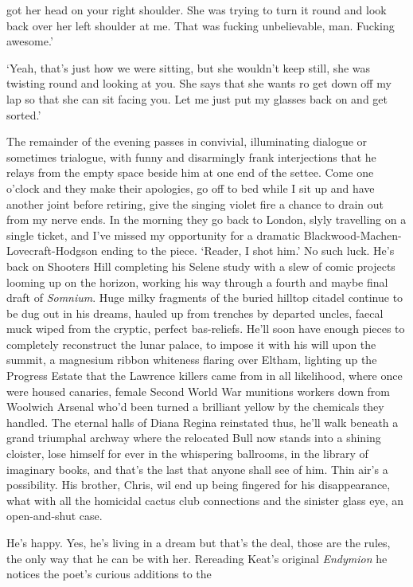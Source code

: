 \documentclass[
]{article}
\begin{document}
got her head on your right shoulder. She was trying to turn it round and
look back over her left shoulder at me. That was fucking unbelievable,
man. Fucking awesome.' \par
`Yeah, that's just how we were sitting, but she wouldn't keep
still, she was twisting round and looking at you. She says that she
wants ro get down off my lap so that she can sit facing you. Let me just
put my glasses back on and get sorted.' \par
The remainder of the evening passes in convivial, illuminating
dialogue or sometimes trialogue, with funny and disarmingly frank
interjections that he relays from the empty space beside him at one end
of the settee. Come one o'clock and they make their apologies, go off to
bed while I sit up and have another joint before retiring, give the
singing violet fire a chance to drain out from my nerve ends. In the
morning they go back to London, slyly travelling on a single ticket, and
I've missed my opportunity for a dramatic
Blackwood-Machen-Lovecraft-Hodgson ending to the piece. `Reader, I shot
him.' No such luck. He's back on Shooters Hill completing his Selene
study with a slew of comic projects looming up on the horizon, working
his way through a fourth and maybe final draft of \emph{Somnium}. Huge
milky fragments of the buried hilltop citadel continue to be dug out in
his dreams, hauled up from trenches by departed uncles, faecal muck
wiped from the cryptic, perfect bas-reliefs. He'll soon have enough
pieces to completely reconstruct the lunar palace, to impose it with his
will upon the summit, a magnesium ribbon whiteness flaring over Eltham,
lighting up the Progress Estate that the Lawrence killers came from in
all likelihood, where once were housed canaries, female Second World War
munitions workers down from Woolwich Arsenal who'd been turned a
brilliant yellow by the chemicals they handled. The eternal halls of
Diana Regina reinstated thus, he'll walk beneath a grand triumphal
archway where the relocated Bull now stands into a shining cloister,
lose himself for ever in the whispering ballrooms, in the library of
imaginary books, and that's the last that anyone shall see of him. Thin
air's a possibility. His brother, Chris, wil end up being fingered for
his disappearance, what with all the homicidal cactus club connections
and the sinister glass eye, an open-and-shut case. \par
He's happy. Yes, he's living in a dream but that's the deal, those
are the rules, the only way that he can be with her. Rereading Keat's
original \emph{Endymion} he notices the poet's curious additions to the
\end{document}
